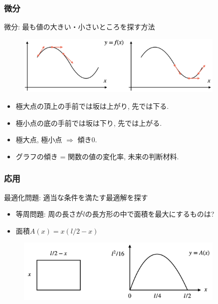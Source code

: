 

\begin{frame}
\frametitle{微分}

微分: 最も値の大きい・小さいところを探す方法

 \begin{figure}[htbp]
 \begin{center} 
  \includegraphics[width=100mm]{calculus1/diff.png}
 \end{center}
\end{figure}


\begin{itemize}
\item 極大点の頂上の手前では坂は上がり, 先では下る. 
\item 極小点の底の手前では坂は下り, 先では上がる. 
\item 極大点, 極小点 $\Rightarrow$ 傾き0. 
\item グラフの傾き = 関数の値の変化率, 未来の判断材料. 
\end{itemize}

\end{frame}




\begin{frame}
\frametitle{応用}   

最適化問題: 適当な条件を満たす最適解を探す

\begin{itemize}
\item 等周問題: 周の長さが$l$の長方形の中で面積を最大にするものは? 
\item 面積$A(x)=x(l/2-x)$
\end{itemize}

 \begin{figure}[htbp]
 \begin{center} 
  \includegraphics[width=100mm]{calculus1/LecArea.png}
 \end{center}
\end{figure}

\end{frame}


